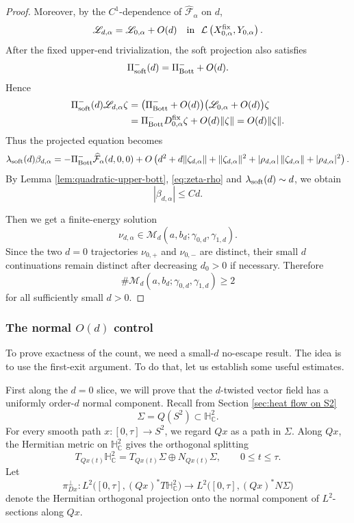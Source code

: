 \documentclass[11pt]{amsart}
\theoremstyle{plain}
\theoremstyle{definition}
\newcommand{\C}{\mathbb{C}}
\newcommand{\HH}{\mathbb{H}}
\begin{document}
\begin{proof}
Moreover, by the $C^1$-dependence of
$\widehat{\mathcal F}_\alpha$ on $d$,
\[
\mathscr L_{d,\alpha}
=\mathscr L_{0,\alpha}+O(d)\quad\text{in }~\mathcal L
\left(X^{\rm fix}_{0,\alpha},Y_{0,\alpha}\right).
\]
After the fixed upper-end trivialization, the soft projection also
satisfies
\[
\Pi_{\rm soft}^-(d)=\Pi_{\rm Bott}^-+O(d).
\]
Hence
\[
\begin{aligned}
\Pi_{\rm soft}^-(d)\mathscr L_{d,\alpha}\zeta
&=\bigl(\Pi_{\rm Bott}^-+O(d)\bigr)
\bigl(\mathscr L_{0,\alpha}+O(d)\bigr)\zeta \\
&=\Pi_{\rm Bott}^-D_{0,\alpha}^{\rm fix}\zeta
+O(d)\|\zeta\|=O(d)\|\zeta\|.
\end{aligned}
\]
Thus the projected equation becomes
\[
\lambda_{\rm soft}(d)\beta_{d,\alpha}
=-\Pi_{\rm Bott}^-\widehat{\mathcal F}_{\alpha}(d,0,0)+O\left(d^2+d\|\zeta_{d,\alpha}\|
+\|\zeta_{d,\alpha}\|^2+|\rho_{d,\alpha}|\,\|\zeta_{d,\alpha}\|+|\rho_{d,\alpha}|^2\right).
\]
By Lemma \ref{lem:quadratic-upper-bott}, \eqref{eq:zeta-rho} and $\lambda_{\rm soft}(d)\sim d$, we obtain
\[
|\beta_{d,\alpha}|\le Cd.
\]

Then we get a finite-energy solution
\[
\nu_{d,\alpha}\in
\mathcal M_d(a,b_d;\gamma_{0,d},\gamma_{1,d}).
\]
Since the two $d=0$ trajectories $\nu_{0,+}$ and $\nu_{0,-}$ are
distinct, their small $d$ continuations remain distinct after
decreasing $d_0>0$ if necessary.  Therefore
\[
\#\mathcal M_d(a,b_d;\gamma_{0,d},\gamma_{1,d})\ge2
\]
for all sufficiently small $d>0$.    
\end{proof}




\subsubsection{The normal $O(d)$ control}

To prove exactness of the count, we need a small-$d$ no-escape result. The idea is to use the first-exit argument. To do that, let us establish some useful estimates.

\smallskip
First along the $d=0$ slice,  we will prove that the $d$-twisted vector field has a uniformly order-$d$ normal component. Recall from Section \ref{sec:heat flow on S2} 
\[
\Sigma=Q(S^2)\subset \HH^2_{\C}.
\]
For every smooth path $x:[0,\tau]\to S^2$, we regard $Qx$ as a path in
$\Sigma$. Along $Qx$, the Hermitian metric on $\HH^2_{\C}$ gives the
orthogonal splitting
\[
T_{Qx(t)}\HH^2_{\C}=T_{Qx(t)}\Sigma
\oplus N_{Qx(t)}\Sigma,\qquad 0\le t\le \tau .
\]
Let
\[
\pi_{Dx}^{\perp}:L^2\bigl([0,\tau],(Qx)^*T\HH^2_{\C}\bigr)
\longrightarrow L^2\bigl([0,\tau],(Qx)^*N\Sigma\bigr)
\]
denote the Hermitian orthogonal projection onto the normal component of $L^2$-sections along $Qx$.
\end{document}

